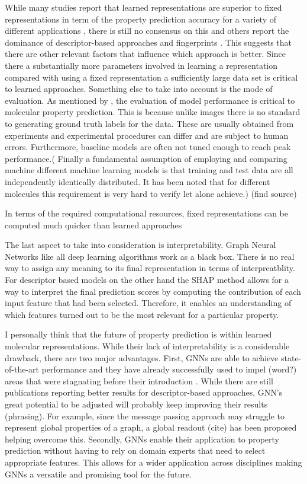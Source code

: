 While many studies report that learned representations are superior to fixed representations in term of the property prediction accuracy for a variety of different applications \citep{wu2018moleculenet,yangMPP, korolev}, there is still no consensus on this and others report the dominance of descriptor-based approaches and fingerprints \citep{mayr, jiang}. This suggests that there are other relevant factors that influence which approach is better. Since there a substantially more parameters involved in learning a representation compared with using a fixed representation a sufficiently large data set is critical to learned approaches. Something else to take into account is the mode of evaluation. As mentioned by \cite{SHEN201929}, the evaluation of model performance is critical to molecular property prediction. This is because unlike images there is no standard to generating ground truth labels for the data. These are usually obtained from experiments and experimental procedures can differ and are subject to human errors. Furthermore, baseline models are often not tuned enough to reach peak performance.( Finally a fundamental assumption of employing and comparing machine different machine learning models is that training and test data are all independently identically distributed. It has been noted that for different molecules this requirement is very hard to verify let alone achieve.) (find source)
 

In terms of the required computational resources, fixed representations can be computed much quicker than learned approaches


The last aspect to take into consideration is interpretability. Graph Neural Networks like all deep learning algorithms work as a black box. There is no real way to assign any meaning to its final representation in terms of interpreatblity.  For descriptor based models on the other hand the SHAP method \citep{lundberg2017unified} allows for a way to interpret the final prediction scores by computing the contribution of each input feature that had been selected. Therefore, it enables an understanding of which features turned  out to be the most relevant for a particular property. 

I personally think that the future of property prediction is within learned molecular representations. While their lack of interpretability is a considerable drawback, there are two major advantages. First, GNNs are able to achieve state-of-the-art performance and they have already successfully used to impel (word?) areas that were stagnating before their introduction \citep{STOKES2020688}. While there are still publications reporting better results for descriptor-based approaches, GNN's great potential to be adjusted will probably keep improving their results (phrasing). For example, since the message passing approach may struggle to represent global properties of a graph, a global readout (cite) has been proposed helping overcome this. Secondly, GNNs enable their application to property prediction without having to rely on domain experts that need to select appropriate features. This allows for a wider application across disciplines making GNNs a versatile and promising tool for the future.
